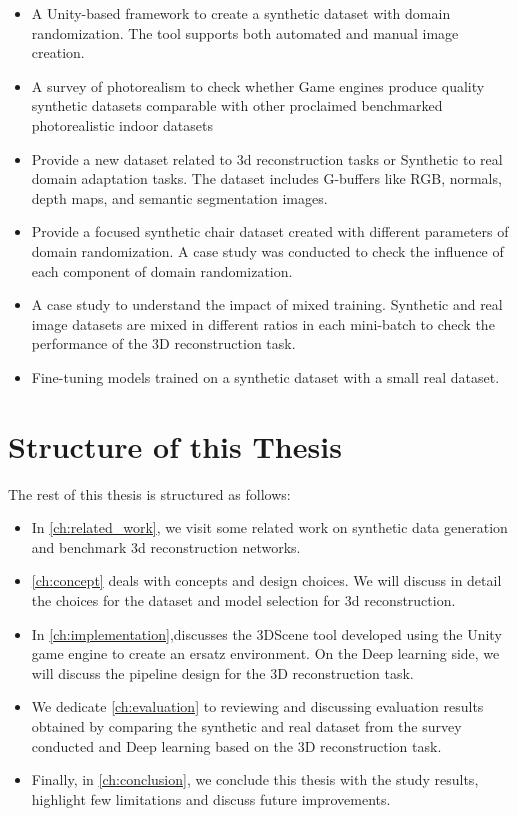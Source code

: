 \begin{itemize}
    \item A Unity-based framework to create a synthetic dataset with domain randomization.
    The tool supports both automated and manual image creation.
    \item A survey of photorealism to check whether Game engines produce quality synthetic datasets comparable with other proclaimed benchmarked photorealistic indoor datasets
    \item Provide a new dataset related to 3d reconstruction tasks or Synthetic to real domain adaptation tasks.
    The dataset includes G-buffers like RGB, normals, depth maps, and semantic segmentation images.
    \item Provide a focused synthetic chair dataset created with different parameters of domain randomization.
    A case study was conducted to check the influence of each component of domain randomization.
    \item A case study to understand the impact of mixed training.
    Synthetic and real image datasets are mixed in different ratios in each mini-batch to check the performance of the 3D reconstruction task.
    \item Fine-tuning models trained on a synthetic dataset with a small real dataset.
\end{itemize}


\section{Structure of this Thesis}\label{sec:Structure of thesis}

The rest of this thesis is structured as follows:

\begin{itemize}
    \item In \autoref{ch:related_work}, we visit some related work on synthetic data generation and benchmark 3d reconstruction networks.
    \item \autoref{ch:concept} deals with concepts and design choices.
    We will discuss in detail the choices for the dataset and model selection for 3d reconstruction.
    \item In \autoref{ch:implementation},discusses the 3DScene tool developed using the Unity game engine to create an ersatz environment.
    On the Deep learning side, we will discuss the pipeline design for the 3D reconstruction task.
    \item We dedicate \autoref{ch:evaluation} to reviewing and discussing evaluation results obtained by comparing the synthetic and real dataset from the survey conducted and Deep learning based on the 3D reconstruction task.
    \item Finally, in \autoref{ch:conclusion}, we conclude this thesis with the study results, highlight few limitations and discuss future improvements.
\end{itemize}